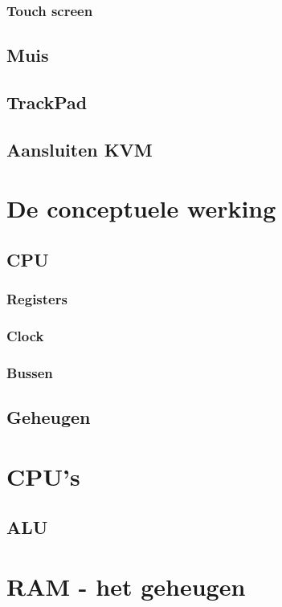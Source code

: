 \documentclass[a4paper,12pt,twoside,openright,titlepage]{book}
\begin{document}
\subsection{Touch screen}
\section{Muis}
\section{TrackPad}
\section{Aansluiten KVM}

\chapter{De conceptuele werking}
\section{CPU}
\subsection{Registers}
\subsection{Clock}
\subsection{Bussen}
\section{Geheugen}

\chapter{CPU's}
\section{ALU}

\chapter{RAM - het geheugen}
\end{document}

